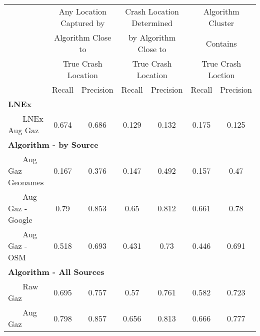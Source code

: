 \begin{tabular}{l cc | cc | cc } \hline  & \multicolumn{2}{c|}{Any Location Captured by} & \multicolumn{2}{c|}{Crash Location Determined} & \multicolumn{2}{c}{Algorithm Cluster} \\  & \multicolumn{2}{c|}{Algorithm Close to} & \multicolumn{2}{c|}{by Algorithm Close to}  & \multicolumn{2}{c}{Contains} \\  & \multicolumn{2}{c|}{True Crash Location} & \multicolumn{2}{c|}{True Crash Location}  & \multicolumn{2}{c}{True Crash Loction} \\  \hline  & Recall & Precision & Recall & Precision & Recall & Precision \\ \hline \multicolumn{3}{l|}{\bf LNEx} & & & & \\  ~~~ LNEx Aug Gaz & 0.674  &  0.686  &  0.129  &  0.132  &  0.175  &  0.125  \\ \multicolumn{3}{l|}{\bf Algorithm - by Source} & & & & \\  ~~~ Aug Gaz - Geonames & 0.167  &  0.376  &  0.147  &  0.492  &  0.157  &  0.47  \\  ~~~ Aug Gaz - Google & 0.79  &  0.853  &  0.65  &  0.812  &  0.661  &  0.78  \\  ~~~ Aug Gaz - OSM & 0.518  &  0.693  &  0.431  &  0.73  &  0.446  &  0.691  \\ \multicolumn{3}{l|}{\bf Algorithm - All Sources} & & & & \\  ~~~ Raw Gaz & 0.695  &  0.757  &  0.57  &  0.761  &  0.582  &  0.723  \\  ~~~ Aug Gaz & 0.798  &  0.857  &  0.656  &  0.813  &  0.666  &  0.777  \\ \hline \end{tabular} 